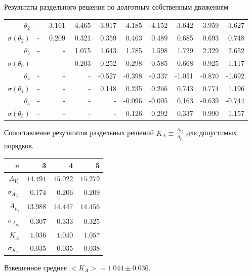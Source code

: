 \documentclass[compress]{beamer}
\begin{document}
\begin{frame}{Результаты раздельного решения по долготным собственным движениям}
\begin{table}[h!!]
\begin{tabular}{r|rrr|r|rrrrr}
 $\theta_2$&-        &  -3.161 &  -4.465 &  -3.917 &  -4.185 &  -4.152 &  -3.642 &  -3.959 &  -3.627  \\
 $\sigma(\theta_2)$&-      &    0.209 &   0.321 &   0.359 &   0.463 &   0.489 &   0.685 &   0.693 &   0.748  \\
 $\theta_3$&-      &    - &   1.075 &   1.643 &   1.785 &   1.598 &   1.729 &   2.329 &   2.652  \\
 $\sigma(\theta_3)$&-      &    - &   0.203 &   0.252 &   0.298 &   0.585 &   0.668 &   0.925 &   1.117  \\
 $\theta_4$&-      &    - &    - &  -0.527 &  -0.398 &  -0.337 &  -1.051 &  -0.870 &  -1.692  \\
 $\sigma(\theta_4)$&-      &    - &    - &    0.148 &   0.235 &   0.266 &   0.743 &   0.774 &   1.196  \\
 $\theta_5$&-      &    - &    - &    - &  -0.096 &  -0.005 &   0.163 &  -0.639 &  -0.744  \\
 $\sigma(\theta_5)$&-      &    - &    - &    - &    0.126 &   0.292 &   0.337 &   0.990 &   1.157  \\

 \end{tabular}
\end{table}
\end{frame}


\begin{frame}{Сопоставление результатов раздельных решений}
        $K_A \equiv \frac{A_{V_r}}{A_{\mu_l}}$ для допустимых порядков.
\begin{table}[h!!] 
\centering
\begin{tabular}{r|rrr}
        $ n$ & 3 & 4 & 5 \\
\hline
\hline
$A_{V_r} $& $14.491     $&  $  15.022$ & $ 15.279 $ \\
$\sigma_{A_{V_r}}$& $0.174 $    &  $0.206 $& $  0.209  $\\
$A_{\mu_l} $& $13.988 $    & $ 14.447$ & $14.456 $ \\
$\sigma_{A_{\mu_l}}$& $0.307 $    & $0.333 $& $0.325 $ \\
\hline
$K_A$& $1.036 $    &   $1.040 $& $ 1.057 $ \\
$ \sigma_{K_A}$& $0.035 $    & $0.035 $&  $0.038 $ 
\end{tabular}
\end{table}

Взвешенное среднее ${<}K_A{>} = 1.044 \pm 0.036$.
\end{frame}
\end{document}
